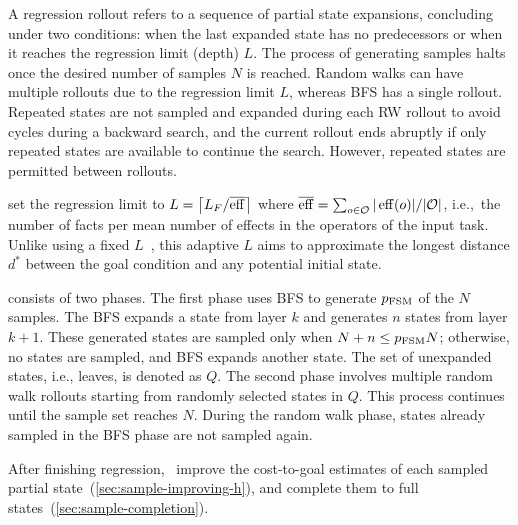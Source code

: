 \documentclass[ppgc,diss,english]{iiufrgs}
\providecommand{\ceil}[1]{\ensuremath{\left\lceil #1\right\rceil}}
\begin{document}
A regression rollout refers to a sequence of partial state expansions, concluding under two conditions: when the last expanded state has no predecessors or when it reaches the regression limit (depth) $L$. The process of generating samples halts once the desired number of samples $N$ is reached. Random walks can have multiple rollouts due to the regression limit $L$, whereas BFS has a single rollout. Repeated states are not sampled and expanded during each RW rollout to avoid cycles during a backward search, and the current rollout ends abruptly if only repeated states are available to continue the search. However, repeated states are permitted between rollouts.

\citet{Bettker.etal/2022} set the regression limit to $L=\ceil{\facts/\overline{\eff}}$ where $\overline{\operatorname{eff}}=\sum_{o\in \mathcal{O}} |\operatorname{eff}(o)|/|\mathcal{O}|$, i.e.,~the number of facts per mean number of effects in the operators of the input task. Unlike using a fixed $L$~\cite{Yu.etal/2020, OToole/2022}, this adaptive $L$ aims to approximate the longest distance $d^{*}$ between the goal condition and any potential initial state.

\bfsrw consists of two phases. The first phase uses BFS to generate $p_\text{FSM}$ of the $N$ samples. The BFS expands a state from layer $k$ and generates $n$ states from layer $k+1$. These generated states are sampled only when $N + n \leq p_{\text{FSM}}N$; otherwise, no states are sampled, and BFS expands another state. The set of unexpanded states, i.e., leaves, is denoted as $Q$. The second phase involves multiple random walk rollouts starting from randomly selected states in $Q$. This process continues until the sample set reaches $N$. During the random walk phase, states already sampled in the BFS phase are not sampled again.

After finishing regression,~\citet{Bettker.etal/2022} improve the cost-to-goal estimates of each sampled partial state~(\cref{sec:sample-improving-h}), and complete them to full states~(\cref{sec:sample-completion}).
\end{document}
